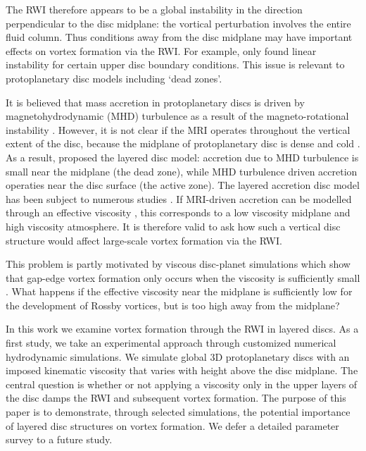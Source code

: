 \documentclass[useAMS,usenatbib]{mn2e}
\begin{document}
The RWI therefore appears to be a global instability in the direction
perpendicular to the disc midplane: the vortical perturbation involves
the entire fluid column. Thus conditions away
from the disc midplane may have important effects on vortex formation
via the RWI. For example, \cite{lin13a} only found linear
instability for certain upper disc boundary conditions. This issue is
relevant to protoplanetary disc models including `dead zones'.   

It is believed that mass accretion in protoplanetary discs is driven by
magnetohydrodynamic (MHD) turbulence as a result of the
magneto-rotational instability \citep[MRI,][]{balbus91,balbus98}. However, it
is not clear if the MRI operates throughout the vertical extent of the
disc, because the midplane of protoplanetary 
disc is dense and cold \citep{armitage11}. As a result, \cite{gammie96}
proposed the layered disc model: accretion due to MHD turbulence
is small near the midplane (the dead zone), while MHD turbulence
driven accretion 
operaties near the disc surface (the active zone). The layered
accretion disc model has been subject to numerous studies 
\citep[e.g.,][]{fleming03,terquem08,oishi09,dzy10,kretke10,okuzumi11,flaig11,landry13}.      
If MRI-driven accretion can be modelled through an effective 
viscosity \citep{balbus99}, this corresponds to a low viscosity midplane and 
high viscosity atmosphere. It is therefore valid to ask how such a
vertical disc structure would affect large-scale vortex formation via
the RWI.  

This problem is partly motivated by viscous disc-planet
simulations which show that  gap-edge vortex formation only
occurs when the viscosity is sufficiently small
\citep{valborro06,valborro07,edgar08}. %
What happens if the effective viscosity near the midplane is
sufficiently low for the development of Rossby vortices, 
but is too high away from the midplane? 

In this work we examine vortex formation through the RWI in
layered discs. As a first study, we take an
experimental approach through customized numerical hydrodynamic
simulations. We simulate global 3D protoplanetary discs with an imposed
kinematic viscosity that varies with height above the disc
midplane. %
The central question is whether or not applying a viscosity only in the upper
layers of the disc damps the RWI and subsequent vortex formation.   
The purpose of this paper is to demonstrate, through selected 
simulations, the potential importance of layered disc structures on
vortex formation. We defer a detailed parameter survey to a future
study.  
\end{document}
